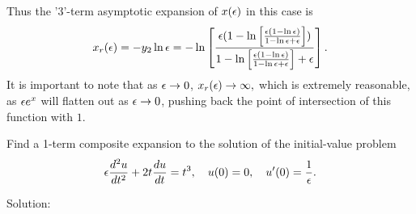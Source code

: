     Thus the '3'-term asymptotic expansion of $x(\epsilon)$ in this case is
    $$x_r(\epsilon)=-y_2\ln\epsilon=-\ln\left[\frac{\epsilon(1-\ln\left[\frac{\epsilon(1-\ln\epsilon)}{1-\ln\epsilon+\epsilon}\right])}{1-\ln\left[\frac{\epsilon(1-\ln\epsilon)}{1-\ln\epsilon+\epsilon}\right]+\epsilon}\right].$$
    It is important to note that as $\epsilon\to 0$, $x_r(\epsilon)\to \infty,$ which is extremely reasonable, as $\epsilon e^x$ will flatten out as $\epsilon\to 0$, pushing back the point of intersection of this function with $1.$

\eenum

\item Find a 1-term composite expansion to the solution of the initial-value problem
$$\epsilon \frac{d^2u}{dt^2}+2t\frac{du}{dt}=t^3,\quad u(0)=0,\quad u'(0)=\frac{1}{\epsilon}.$$

Solution:\\

